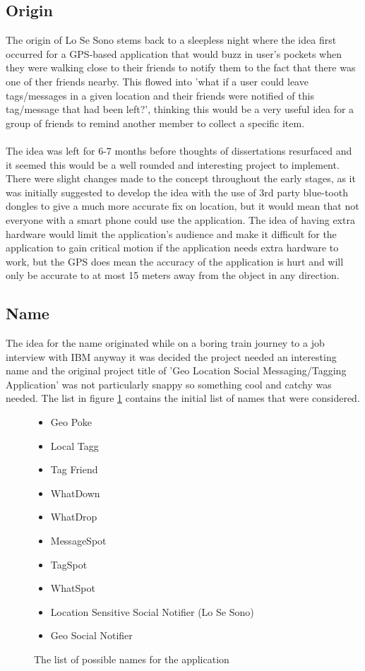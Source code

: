 \subsection{Origin}

The origin of Lo Se Sono stems back to a sleepless night where the idea first occurred for a GPS-based application that would buzz in user's pockets when they were walking close to their friends to notify them to the fact that there was one of ther friends nearby. This flowed into 'what if a user could leave tags/messages in a given location and their friends were notified of this tag/message that had been left?', thinking this would be a very useful idea for a group of friends to remind another member to collect a specific item.\\
\\
The idea was left for 6-7 months before thoughts of dissertations resurfaced and it seemed this would be a well rounded and interesting project to implement. There were slight changes made to the concept throughout the early stages, as it was initially suggested to develop the idea with the use of 3rd party blue-tooth dongles to give a much more accurate fix on location, but it would mean that not everyone with a smart phone could use the application. The idea of having extra hardware would limit the application's audience and make it difficult for the application to gain critical motion if the application needs extra hardware to work, but the GPS does mean the accuracy of the application is hurt and will only be accurate to at most 15 meters away from the object in any direction.

\subsection{Name}

The idea for the name originated while on a boring train journey to a job interview with IBM anyway it was decided the project needed an interesting name and the original project title of 'Geo Location Social Messaging/Tagging Application' was not particularly snappy so something cool and catchy was needed. The list in figure \ref{fig:list_of_names} contains the initial list of names that were considered. 

\begin{figure}[H]
\begin{itemize}
\item Geo Poke
\item Local Tagg
\item Tag Friend
\item WhatDown
\item WhatDrop
\item MessageSpot
\item TagSpot
\item WhatSpot
\item Location Sensitive Social Notifier (Lo Se Sono)
\item Geo Social Notifier
\end{itemize}
\caption{The list of possible names for the application}
\label{fig:list_of_names}
\end{figure}

